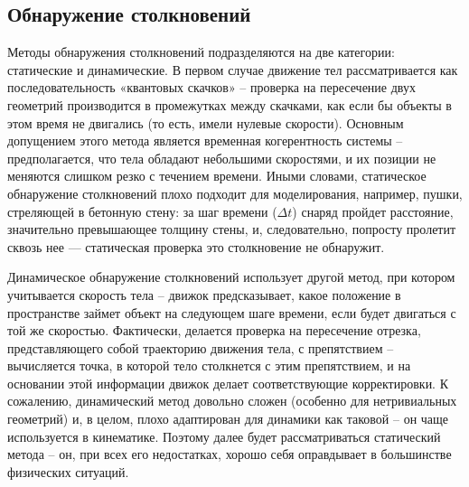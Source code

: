 \subsection{Обнаружение столкновений}
Методы обнаружения столкновений подразделяются на две категории: статические и динамические. В первом случае
движение тел рассматривается как последовательность «квантовых скачков» – проверка на пересечение двух геометрий
производится в промежутках между скачками, как если бы объекты в этом время не двигались (то есть, имели нулевые
скорости). Основным допущением этого метода является временная когерентность системы – предполагается, что тела
обладают небольшими скоростями, и их позиции не меняются слишком резко с течением времени. Иными словами,
статическое обнаружение столкновений плохо подходит для моделирования, например, пушки, стреляющей в бетонную
стену: за шаг времени ($\Delta{t}$) снаряд пройдет расстояние, значительно превышающее толщину стены, и, следовательно,
попросту пролетит сквозь нее --- статическая проверка это столкновение не обнаружит.

Динамическое обнаружение столкновений использует другой метод, при котором учитывается скорость тела – движок
предсказывает, какое положение в пространстве займет объект на следующем шаге времени, если будет двигаться с той же
скоростью. Фактически, делается проверка на пересечение отрезка, представляющего собой траекторию движения тела, с
препятствием – вычисляется точка, в которой тело столкнется с этим препятствием, и на основании этой информации движок
делает соответствующие корректировки. К сожалению, динамический метод довольно сложен (особенно для
нетривиальных геометрий) и, в целом, плохо адаптирован для динамики как таковой – он чаще используется в кинематике.
Поэтому далее будет рассматриваться статический метода – он, при всех его недостатках, хорошо себя оправдывает в
большинстве физических ситуаций.

